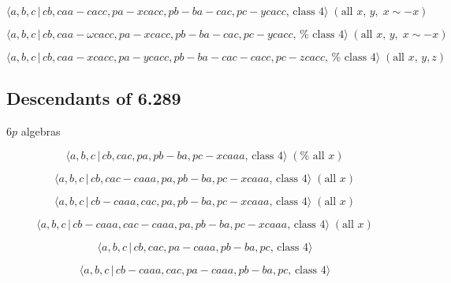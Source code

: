 \documentclass[10pt]{article}
\begin{document}
\begin{equation}
\langle a,b,c\,|\,cb,caa-cacc,pa-xcacc,pb-ba-cac,pc-ycacc,\,\text{class }%
4\rangle \;(\text{all }x,\,y,\;x\sim -x)  \tag{7.2295}
\end{equation}

\begin{equation}
\langle a,b,c\,|\,cb,caa-\omega cacc,pa-xcacc,pb-ba-cac,pc-ycacc,\,\text{%
class }4\rangle \;(\text{all }x,\,y,\;x\sim -x)  \tag{7.2296}
\end{equation}

\begin{equation}
\langle a,b,c\,|\,cb,caa-xcacc,pa-ycacc,pb-ba-cac-cacc,pc-zcacc,\,\text{%
class }4\rangle \;(\text{all }x,\,y,z)  \tag{7.2297}
\end{equation}

\subsection{Descendants of 6.289}

$6p$ algebras

\begin{equation}
\langle a,b,c\,|\,cb,cac,pa,pb-ba,pc-xcaaa,\,\text{class }4\rangle \;(\text{%
all }x)  \tag{7.2298}
\end{equation}

\begin{equation}
\langle a,b,c\,|\,cb,cac-caaa,pa,pb-ba,pc-xcaaa,\,\text{class }4\rangle \;(%
\text{all }x)  \tag{7.2299}
\end{equation}

\begin{equation}
\langle a,b,c\,|\,cb-caaa,cac,pa,pb-ba,pc-xcaaa,\,\text{class }4\rangle \;(%
\text{all }x)  \tag{7.2300}
\end{equation}

\begin{equation}
\langle a,b,c\,|\,cb-caaa,cac-caaa,pa,pb-ba,pc-xcaaa,\,\text{class }4\rangle
\;(\text{all }x)  \tag{7.2301}
\end{equation}

\begin{equation}
\langle a,b,c\,|\,cb,cac,pa-caaa,pb-ba,pc,\,\text{class }4\rangle 
\tag{7.2302}
\end{equation}

\begin{equation}
\langle a,b,c\,|\,cb-caaa,cac,pa-caaa,pb-ba,pc,\,\text{class }4\rangle 
\tag{7.2303}
\end{equation}
\end{document}
